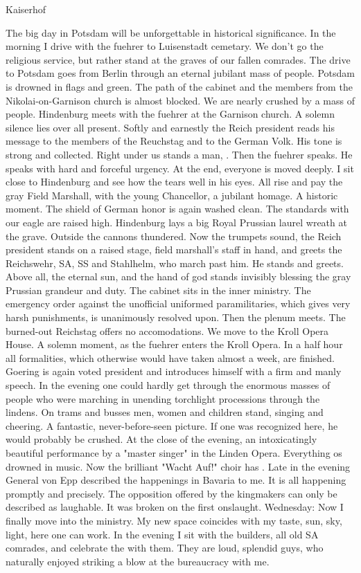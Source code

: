 Kaiserhof

The big day in Potsdam will be unforgettable in historical significance. In the morning I drive with the fuehrer to Luisenstadt cemetary. We don't go the religious service, but rather stand at the graves of our fallen comrades. The drive to Potsdam goes from Berlin through an eternal jubilant mass of people. Potsdam is drowned in flags and green. The path of the cabinet and the members from the Nikolai-on-Garnison church is almost blocked. We are nearly crushed by a mass of people. Hindenburg meets with the fuehrer at the Garnison church. A solemn silence lies over all present. Softly and earnestly the Reich president reads his message to the members of the Reuchstag and to the German Volk. His tone is strong and collected. Right under us stands a man, . Then the fuehrer speaks. He speaks with hard and forceful urgency. At the end, everyone is moved deeply. I sit close to Hindenburg and see how the tears well in his eyes. All rise and pay the gray Field Marshall,  with the young Chancellor, a jubilant homage. A historic moment. The shield of German honor is again washed clean. The standards with our eagle are raised high. Hindenburg lays a big Royal Prussian laurel wreath at the grave. Outside the cannons thundered. Now the trumpets sound, the Reich president stands on a raised stage, field marshall's staff in hand, and greets the Reichswehr, SA, SS and Stahlhelm, who march past him. He stands and greets. Above all, the eternal sun, and the hand of god stands invisibly blessing the gray Prussian grandeur and duty. The cabinet sits in the inner ministry. The emergency order against the unofficial uniformed paramilitaries, which gives very harsh punishments, is unanimously resolved upon. Then the plenum meets. The burned-out Reichstag offers no accomodations. We move to the Kroll Opera House. A solemn moment, as the fuehrer enters the Kroll Opera. In a half hour all formalities, which otherwise would have taken almost a week, are finished. Goering is again voted president and introduces himself with a firm and manly speech. In the evening one could hardly get through the enormous masses of people who were marching in unending torchlight processions through the lindens. On trams and busses men, women and children stand, singing and cheering. A fantastic, never-before-seen picture. If one was recognized here, he would probably be crushed. At the close of the evening, an intoxicatingly beautiful performance by a "master singer" in the Linden Opera. Everything os drowned in music. Now the brilliant "Wacht Auf!" choir has . Late in the evening General von Epp described the happenings in Bavaria to me. It is all happening promptly and precisely. The opposition offered by the kingmakers can only be described as laughable. It was broken on the first onslaught.
Wednesday: Now I finally move into the ministry. My new space coincides with my taste, sun, sky, light, here one can work. In the evening I sit with the builders, all old SA comrades, and celebrate the  with them. They are loud, splendid guys, who naturally enjoyed striking a blow at the bureaucracy with me.

